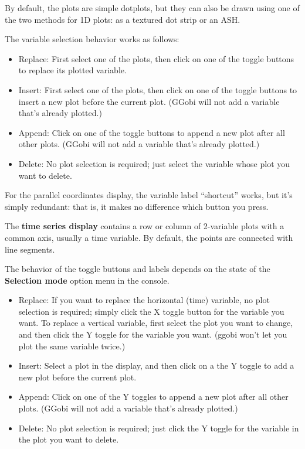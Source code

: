 \documentclass[11pt]{article}
\def\Widget#1{\textbf{#1}}
\begin{document}
By default, the plots are simple dotplots, but they can also be drawn
using one of the two methods for 1D plots:  as a textured dot
strip or an ASH.

The variable selection behavior works as follows:

\begin{itemize}
\item Replace:  First select one of the plots, then click on one
  of the toggle buttons to replace its plotted variable.
\item Insert:  First select one of the plots, then click on
  one of the toggle buttons to insert a new plot before
  the current plot.  (GGobi will not add a variable that's
  already plotted.)
\item Append:  Click on one of the toggle buttons to append
  a new plot after all other plots.  (GGobi will not add a variable
  that's already plotted.)
\item Delete:  No plot selection is required; just select the
  variable whose plot you want to delete.
\end{itemize}

For the parallel coordinates display, the variable label ``shortcut''
works, but it's simply redundant: that is, it makes no difference which
button you press.


The \Widget{time series display} contains a row or column of 2-variable
plots with a common axis, usually a time variable.  By default, the
points are connected with line segments.  

The behavior of the toggle buttons and labels depends on the state of the
\Widget{Selection mode} option menu in the console.

\begin{itemize}
\item Replace: If you want to replace the horizontal (time) variable,
  no plot selection is required; simply click the X toggle
  button for the variable you want.  To replace a vertical variable,
  first select the plot you want to change, and then click the
  Y toggle for the variable you want.  (ggobi won't
  let you plot the same variable twice.)
\item Insert:  Select a plot in the display, and then click
  on a the Y toggle to add a new plot before the current plot.
\item Append:  Click on one of the Y toggles to append
  a new plot after all other plots.  (GGobi will not add a variable
  that's already plotted.)
\item Delete: No plot selection is required; just click the
  Y toggle for the variable in the plot you want to delete.
\end{itemize}
\end{document}
